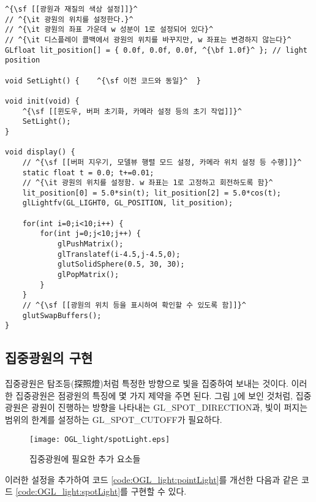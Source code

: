 \begin{algorithmbis}\label{code:OGL_light:pointLight}
\lstset{language=C++, escapechar=^} 
\begin{lstlisting}
^{\sf [[광원과 재질의 색상 설정]]}^
// ^{\it 광원의 위치를 설정한다.}^
// ^{\it 광원의 좌표 가운데 w 성분이 1로 설정되어 있다}^
// ^{\it 디스플레이 콜백에서 광원의 위치를 바꾸지만, w 좌표는 변경하지 않는다}^
GLfloat lit_position[] = { 0.0f, 0.0f, 0.0f, ^{\bf 1.0f}^ }; // light position

void SetLight() {    ^{\sf 이전 코드와 동일}^  }

void init(void) {
    ^{\sf [[윈도우, 버퍼 초기화, 카메라 설정 등의 초기 작업]]}^
    SetLight();
}

void display() {
    // ^{\sf [[버퍼 지우기, 모델뷰 행렬 모드 설정, 카메라 위치 설정 등 수행]]}^
    static float t = 0.0; t+=0.01;
    // ^{\it 광원의 위치를 설정함. w 좌표는 1로 고정하고 회전하도록 함}^
    lit_position[0] = 5.0*sin(t); lit_position[2] = 5.0*cos(t);
    glLightfv(GL_LIGHT0, GL_POSITION, lit_position);

    for(int i=0;i<10;i++) {
        for(int j=0;j<10;j++) {
            glPushMatrix();
            glTranslatef(i-4.5,j-4.5,0);
            glutSolidSphere(0.5, 30, 30);
            glPopMatrix();
        }
    }
    // ^{\sf [[광원의 위치 등을 표시하여 확인할 수 있도록 함]]}^
    glutSwapBuffers();
}
\end{lstlisting}
\end{algorithmbis}

\subsection{집중광원의 구현}

집중광원은 탐조등(探照燈)처럼 특정한 방향으로 빛을 집중하여 보내는 것이다.
이러한 집중광원은 점광원의 특징에 몇 가지 제약을 주면 된다.
그림 \ref{fig:OGL_light:spotLight}에 보인 것처럼, 집중광원은 광원이 진행하는 방향을 나타내는
{\sf GL\_SPOT\_DIRECTION}과, 빛이 퍼지는 범위의 한계를 설정하는 {\sf GL\_SPOT\_CUTOFF}가 필요하다.

\begin{figure}[h!]
  \centering
    \texttt{[image: OGL\_light/spotLight.eps]}
    \caption{집중광원에 필요한 추가 요소들}
    \label{fig:OGL_light:spotLight}
\end{figure}

이러한 설정을 추가하여 코드 \ref{code:OGL_light:pointLight}를 개선한 다음과 같은 
코드 \ref{code:OGL_light:spotLight}를 구현할 수 있다.

